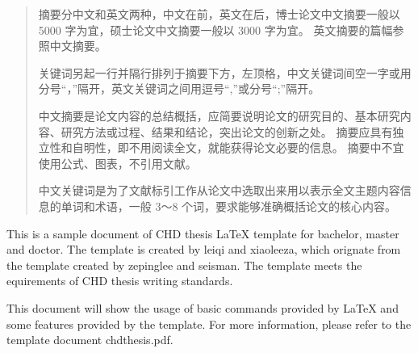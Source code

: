 

\begin{abstract}
  摘要分中文和英文两种，中文在前，英文在后，博士论文中文摘要一般以 5000 字为宜，硕士论文中文摘要一般以 3000 字为宜。
  英文摘要的篇幅参照中文摘要。

  关键词另起一行并隔行排列于摘要下方，左顶格，中文关键词间空一字或用分号“，”隔开，英文关键词之间用逗号“,”或分号“;”隔开。

  中文摘要是论文内容的总结概括，应简要说明论文的研究目的、基本研究内容、研究方法或过程、结果和结论，突出论文的创新之处。
  摘要应具有独立性和自明性，即不用阅读全文，就能获得论文必要的信息。
  摘要中不宜使用公式、图表，不引用文献。

  中文关键词是为了文献标引工作从论文中选取出来用以表示全文主题内容信息的单词和术语，一般 3～8 个词，要求能够准确概括论文的核心内容。
\end{abstract}
\cleardoublepage
\begin{abstract*}
  This is a sample document of CHD thesis \LaTeX{} template for bachelor,
  master and doctor. The template is created by leiqi and xiaoleeza, which
  orignate from the template created by zepinglee and seisman. The template meets the
  equirements of CHD thesis writing standards.

  This document will show the usage of basic commands provided by \LaTeX{} and
  some features provided by the template. For more information, please refer to
  the template document chdthesis.pdf.
\end{abstract*}
